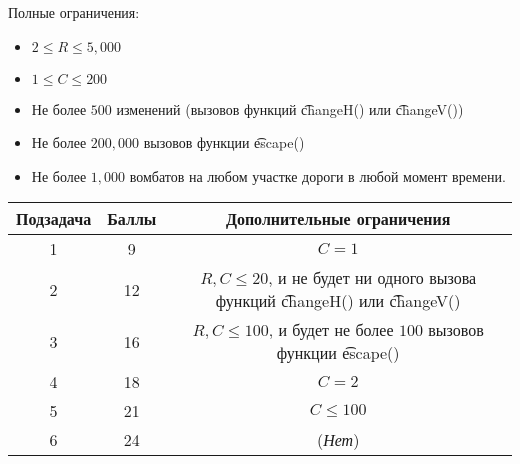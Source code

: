 Полные ограничения:
\begin{itemize}
\item $2 \leq R \leq 5,000$
\item $1 \leq C \leq 200$
\item Не более $500$ изменений (вызовов функций \t{changeH()} или \t{changeV()})
\item Не более $200,000$ вызовов функции \t{escape()}
\item Не более $1,000$ вомбатов на любом участке дороги в любой момент времени.
\end{itemize}
\begin{center}
\begin{tabular}{ |c|c|c| }
\hline
Подзадача & Баллы & Дополнительные ограничения\\
\hline
1 & 9 & $C=1$\\
\hline
2 & 12 & $R,C \leq 20$, и не будет ни одного вызова функций \t{changeH()} или \t{changeV()}\\
\hline
3 & 16 & $R,C \leq 100$, и будет не более $100$ вызовов функции \t{escape()}\\
\hline
4 & 18 & $C=2$\\
\hline
5 & 21 & $C \leq 100$\\
\hline
6 & 24 & (\textit{Нет})\\
\hline
\end{tabular}
\end{center}
